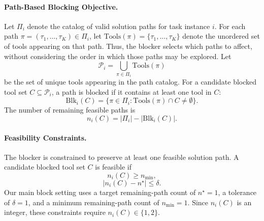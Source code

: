 \documentclass{llmxive}
\begin{document}
\paragraph{Path-Based Blocking Objective.}
Let $\Pi_i$ denote the catalog of valid solution paths for task instance $i$.
For each path $\pi=(\tau_1,\ldots,\tau_K)\in\Pi_i$, let $\mathrm{Tools}(\pi)=\{\tau_1,\ldots,\tau_K\}$ denote the unordered set of tools appearing on that path.
Thus, the blocker selects which paths to affect, without considering the order in which those paths may be explored.
Let
\begin{equation}
\mathcal{P}_i = \bigcup_{\pi \in \Pi_i} \mathrm{Tools}(\pi)
\end{equation}
be the set of unique tools appearing in the path catalog.
For a candidate blocked tool set $C \subseteq \mathcal{P}_i$, a path is blocked if it contains at least one tool in $C$:
\begin{equation}
\mathrm{Blk}_i(C)
=
\{\pi \in \Pi_i : \mathrm{Tools}(\pi) \cap C \neq \emptyset\}.
\end{equation}
The number of remaining feasible paths is
\begin{equation}
n_i(C)
=
|\Pi_i| - |\mathrm{Blk}_i(C)|.
\end{equation}

\paragraph{Feasibility Constraints.}
The blocker is constrained to preserve at least one feasible solution path.
A candidate blocked tool set $C$ is feasible if
\begin{equation}
n_i(C)\geq n_{\min},
\end{equation}
\begin{equation}
|n_i(C)-n^\star|\leq\delta.
\end{equation}
Our main block setting uses a target remaining-path count of $n^\star=1$, a tolerance of $\delta=1$, and a minimum remaining-path count of $n_{\min}=1$.
Since $n_i(C)$ is an integer, these constraints require $n_i(C)\in\{1,2\}$.
\end{document}
